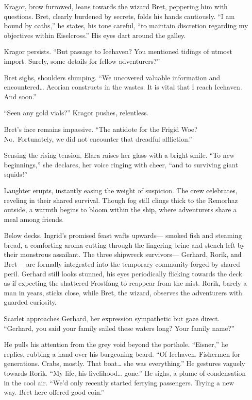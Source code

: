 \documentclass[
  letterpaper,12pt,twoside,twocolumn,openany,
  nodeprecatedcode,bg=full]{dndbook}
\begin{document}
Kragor, brow furrowed, leans towards the wizard Bret, peppering him with
questions. Bret, clearly burdened by secrets, folds his hands
cautiously. ``I am bound by oaths,'' he states, his tone careful, ``to
maintain discretion regarding my objectives within Eiselcross.'' His
eyes dart around the galley.

Kragor persists. ``But passage to Icehaven? You mentioned tidings of
utmost import. Surely, some details for fellow adventurers?''

Bret sighs, shoulders slumping. ``We uncovered valuable information and
encountered\ldots{} Aeorian constructs in the wastes. It is vital that I
reach Icehaven. And soon.''

``Seen any gold vials?'' Kragor pushes, relentless.

Bret's face remains impassive. ``The antidote for the Frigid Woe?
No.~Fortunately, we did not encounter that dreadful affliction.''

Sensing the rising tension, Elara raises her glass with a bright smile.
``To new beginnings,'' she declares, her voice ringing with cheer, ``and
to surviving giant squids!''

Laughter erupts, instantly easing the weight of suspicion. The crew
celebrates, reveling in their shared survival. Though fog still clings
thick to the Remorhaz outside, a warmth begins to bloom within the ship,
where adventurers share a meal among friends.

Below decks, Ingrid's promised feast wafts upwards--- smoked fish and
steaming bread, a comforting aroma cutting through the lingering brine
and stench left by their monstrous assailant. The three shipwreck
survivors--- Gerhard, Rorik, and Bret--- are formally integrated into
the temporary community forged by shared peril. Gerhard still looks
stunned, his eyes periodically flicking towards the deck as if expecting
the shattered Frostfang to reappear from the mist. Rorik, barely a man
in years, sticks close, while Bret, the wizard, observes the adventurers
with guarded curiosity.

Scarlet approaches Gerhard, her expression sympathetic but gaze direct.
``Gerhard, you said your family sailed these waters long? Your family
name?''

He pulls his attention from the grey void beyond the porthole.
``Eisner,'' he replies, rubbing a hand over his burgeoning beard. ``Of
Icehaven. Fishermen for generations. Crabs, mostly. That boat\ldots{}
she was everything.'' He gestures vaguely towards Rorik. ``My life, his
livelihood\ldots{} gone.'' He sighs, a plume of condensation in the cool
air. ``We'd only recently started ferrying passengers. Trying a new way.
Bret here offered good coin.''
\end{document}
